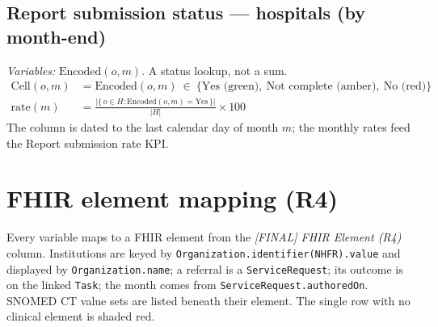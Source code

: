 \documentclass[11pt]{article}
\newcommand{\Encoded}{\mathrm{Encoded}}
\newcommand{\fhir}[1]{\texttt{#1}}
\begin{document}
\subsection{Report submission status --- hospitals (by month-end)}\label{sec:submission}
\textit{Variables:} $\Encoded(o,m)$. A status lookup, not a sum.
\begin{align}
\mathrm{Cell}(o,m) &= \Encoded(o,m)\ \in\ \{\text{Yes (green)},\ \text{Not complete (amber)},\ \text{No (red)}\} \label{eq:cell}\\[2pt]
\mathrm{rate}(m) &= \frac{\bigl|\{\,o\in H : \Encoded(o,m)=\text{Yes}\,\}\bigr|}{|H|}\times 100 \label{eq:ratem}
\end{align}
The column is dated to the last calendar day of month $m$; the monthly rates feed the Report submission rate KPI.

\section{FHIR element mapping (R4)}\label{sec:fhir}
Every variable maps to a FHIR element from the \emph{[FINAL] FHIR Element (R4)} column. Institutions are keyed by \fhir{Organization.identifier(NHFR).value} and displayed by \fhir{Organization.name}; a referral is a \fhir{ServiceRequest}; its outcome is on the linked \fhir{Task}; the month comes from \fhir{ServiceRequest.authoredOn}. SNOMED CT value sets are listed beneath their element. The single row with no clinical element is shaded red.
\end{document}
